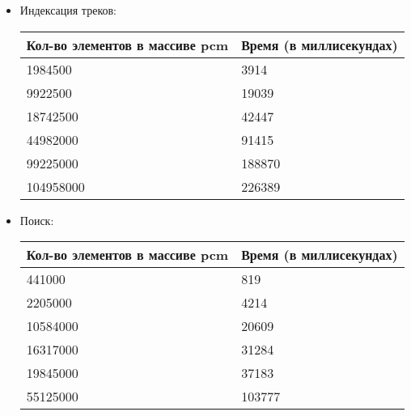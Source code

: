\documentclass[12pt]{article}
\begin{document}
    \begin{itemize}
        \item Индексация треков: \\
        
            \begin{tabular}{ | l | l | }
                \hline
                    Кол-во элементов в массиве pcm & Время (в миллисекундах) \\ \hline
                    1984500 & 3914 \\
                    9922500 & 19039 \\
                    18742500 & 42447 \\
                    44982000 & 91415 \\
                    99225000 & 188870 \\
                    104958000 & 226389 \\
                \hline
            \end{tabular}
        \item Поиск: \\
        
            \begin{tabular}{ | l | l | }
                \hline
                    Кол-во элементов в массиве pcm & Время (в миллисекундах) \\ \hline
                    441000 & 819 \\
                    2205000 & 4214 \\            
                    10584000 & 20609 \\
                    16317000 & 31284 \\
                    19845000 & 37183 \\
                    55125000 & 103777 \\
                \hline
            \end{tabular}    

\\
    

\end{itemize}
\end{document}

